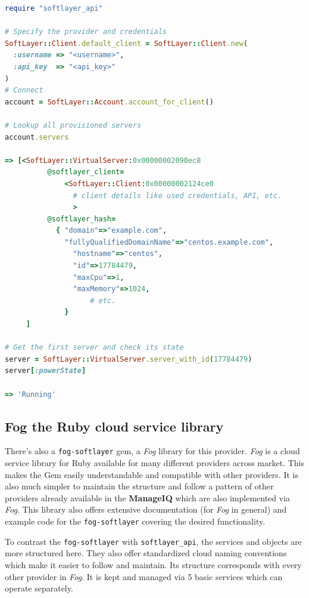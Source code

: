 \begin{lstlisting}[language=Ruby,caption={Example code for the \texttt{softlayer\_api}},label=code:softlayer_api,float=htpb]
require "softlayer_api"

# Specify the provider and credentials
SoftLayer::Client.default_client = SoftLayer::Client.new(
  :username => "<username>",
  :api_key  => "<api_key>"
)
# Connect
account = SoftLayer::Account.account_for_client()

# Lookup all provisioned servers
account.servers

=> [<SoftLayer::VirtualServer:0x00000002090ec8
		  @softlayer_client=
			  <SoftLayer::Client:0x00000002124ce0
				# client details like used credentials, API, etc.
				>
		  @softlayer_hash=
		   	{ "domain"=>"example.com",
		      "fullyQualifiedDomainName"=>"centos.example.com",
		    	"hostname"=>"centos",
		    	"id"=>17784479,
		    	"maxCpu"=>1,
		    	"maxMemory"=>1024,
					# etc.
			  }
	 ]

# Get the first server and check its state
server = SoftLayer::VirtualServer.server_with_id(17784479)
server[:powerState]

=> 'Running'
\end{lstlisting}

\subsection{Fog the Ruby cloud service library}
\label{sub:Fog cloud library}

There's also a \texttt{fog-softlayer} gem, a \emph{Fog} library for this provider\cite{fog-softlayer}. \emph{Fog} is a cloud service library for Ruby available for many different providers across market. This makes the Gem easily understandable and compatible with other providers. It is also much simpler to maintain the structure and follow a pattern of other providers already available in the \textbf{ManageIQ} which are also implemented via \emph{Fog}. This library also offers extensive documentation (for \emph{Fog} in general) and example code for the \texttt{fog-softlayer} covering the desired functionality.

To contrast the \texttt{fog-softlayer} with \texttt{softlayer\_api}, the services and objects are more structured here. They also offer standardized cloud naming conventions which make it easier to follow and maintain. Its structure corresponds with every other provider in \emph{Fog}. It is kept and managed via 5 basic services which can operate separately.

